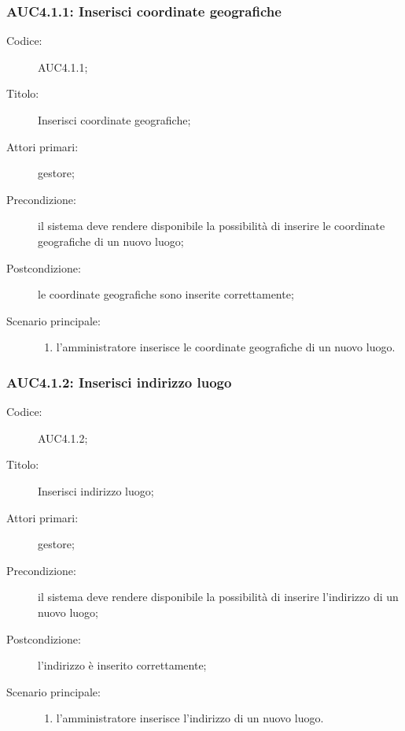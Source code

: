 \documentclass[../../../analisi-dei-requisiti.tex]{subfiles}
\begin{document}
\subsubsection{AUC4.1.1: Inserisci coordinate geografiche}%
\label{subs:AUC4.1.1}
\begin{description}
  \item[Codice:] AUC4.1.1;
  \item[Titolo:] Inserisci coordinate geografiche;
  \item[Attori primari:] gestore;
  \item[Precondizione:] il sistema deve rendere disponibile la possibilità di inserire le coordinate geografiche di un nuovo luogo;
  \item[Postcondizione:] le coordinate geografiche sono inserite correttamente;
  \item[Scenario principale:]
  \begin{enumerate}
    \item l'amministratore inserisce le coordinate geografiche di un nuovo luogo.
  \end{enumerate}
\end{description}

\subsubsection{AUC4.1.2: Inserisci indirizzo luogo}%
\label{subs:AUC4.1.2}
\begin{description}
  \item[Codice:] AUC4.1.2;
  \item[Titolo:] Inserisci indirizzo luogo;
  \item[Attori primari:] gestore;
  \item[Precondizione:] il sistema deve rendere disponibile la possibilità di inserire l'indirizzo di un nuovo luogo;
  \item[Postcondizione:] l'indirizzo è inserito correttamente;
  \item[Scenario principale:]
  \begin{enumerate}
    \item l'amministratore inserisce l'indirizzo di un nuovo luogo.
  \end{enumerate}
\end{description}
\end{document}
